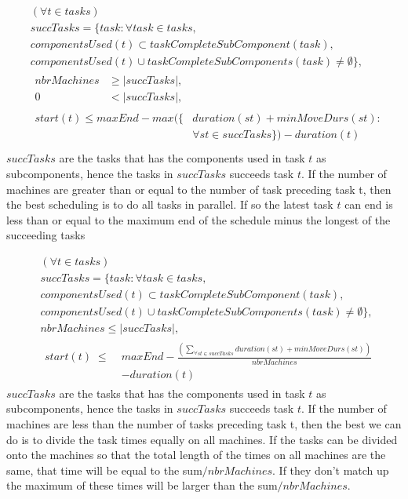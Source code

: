  \begin{equation}\label{eq:72}
 \begin{aligned}
 &(\forall t \in tasks) \\
 &succTasks = \{task : \forall task \in tasks,\\
 &componentsUsed(t) \subset taskCompleteSubComponent(task), \\
 &componentsUsed(t) \cup taskCompleteSubComponents(task) \neq \emptyset\}, \\
 &\begin{aligned}
 nbrMachines &\ge |succTasks|,\\
 0 &< |succTasks|,
 \end{aligned}\\
 &\begin{aligned}
 start(t) \le maxEnd - max(\{&duration(st) + minMoveDurs(st) :\\
 &\forall st \in succTasks\}) - duration(t)
 \end{aligned}\\
 \end{aligned}
 \end{equation}
 $succTasks$ are the tasks that has the components used in task $t$ as subcomponents, hence the tasks in $succTasks$ succeeds task $t$. If the number of machines are greater than or equal to the number of task preceding task t, then the best scheduling is to do all tasks in parallel. If so the latest task $t$ can end is less than or equal to the maximum end of the schedule minus the longest of the succeeding tasks
 
 \begin{equation}\label{eq:73}
 \begin{aligned}
 &(\forall t \in tasks)\\
 &succTasks = \{task : \forall task \in tasks, \\
 &componentsUsed(t) \subset taskCompleteSubComponent(task), \\
 &componentsUsed(t) \cup taskCompleteSubComponents(task) \neq \emptyset\}, \\
 &nbrMachines \le |succTasks|, \\
 &\begin{aligned}
 start(t) \; \le \; &maxEnd - \frac{\left(\sum_{\forall st \in succTasks}duration(st) + minMoveDurs(st)\right)}{nbrMachines}\\
 &- duration(t)
 \end{aligned}
 \end{aligned}
 \end{equation}
 $succTasks$ are the tasks that has the components used in task $t$ as subcomponents, hence the tasks in $succTasks$ succeeds task $t$. If the number of machines are less than the number of tasks preceding task t, then the best we can do is to divide the task times equally on all machines. If the tasks can be divided onto the machines so that the total length of the times on all machines are the same, that time will be equal to the sum$/nbrMachines$. If they don't match up the maximum of these times will be larger than the sum$/nbrMachines$.
 

